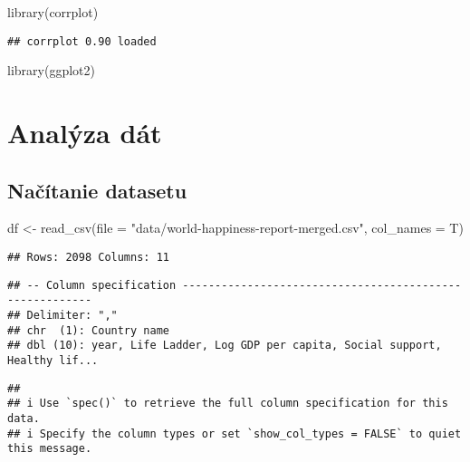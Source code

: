 \documentclass[
]{article}
\newenvironment{Shaded}{\begin{snugshade}}{\end{snugshade}}
\newcommand{\AttributeTok}[1]{\textcolor[rgb]{0.77,0.63,0.00}{#1}}
\newcommand{\FunctionTok}[1]{\textcolor[rgb]{0.00,0.00,0.00}{#1}}
\newcommand{\NormalTok}[1]{#1}
\newcommand{\OtherTok}[1]{\textcolor[rgb]{0.56,0.35,0.01}{#1}}
\newcommand{\StringTok}[1]{\textcolor[rgb]{0.31,0.60,0.02}{#1}}
\begin{document}
\begin{Shaded}
\begin{Highlighting}[]
\FunctionTok{library}\NormalTok{(corrplot)}
\end{Highlighting}
\end{Shaded}

\begin{verbatim}
## corrplot 0.90 loaded
\end{verbatim}

\begin{Shaded}
\begin{Highlighting}[]
\FunctionTok{library}\NormalTok{(ggplot2)}
\end{Highlighting}
\end{Shaded}

\hypertarget{analuxfdza-duxe1t}{%
\section{Analýza dát}\label{analuxfdza-duxe1t}}

\hypertarget{naux10duxedtanie-datasetu}{%
\subsection{Načítanie datasetu}\label{naux10duxedtanie-datasetu}}

\begin{Shaded}
\begin{Highlighting}[]
\NormalTok{df }\OtherTok{\textless{}{-}} \FunctionTok{read\_csv}\NormalTok{(}\AttributeTok{file =} \StringTok{"data/world{-}happiness{-}report{-}merged.csv"}\NormalTok{, }\AttributeTok{col\_names =}\NormalTok{ T)}
\end{Highlighting}
\end{Shaded}

\begin{verbatim}
## Rows: 2098 Columns: 11
\end{verbatim}

\begin{verbatim}
## -- Column specification --------------------------------------------------------
## Delimiter: ","
## chr  (1): Country name
## dbl (10): year, Life Ladder, Log GDP per capita, Social support, Healthy lif...
\end{verbatim}

\begin{verbatim}
## 
## i Use `spec()` to retrieve the full column specification for this data.
## i Specify the column types or set `show_col_types = FALSE` to quiet this message.
\end{verbatim}
\end{document}

